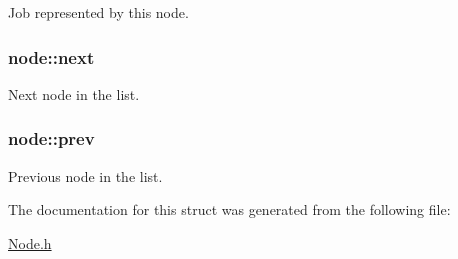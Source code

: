 Job represented by this node. 

\hypertarget{structnode_a29ed78f5e5f0fea79b113e047d18997d}{
\subsubsection[{next}]{ {\bf node::next}}}
\label{structnode_a29ed78f5e5f0fea79b113e047d18997d}


Next node in the list. 

\hypertarget{structnode_a8f67d90e34c478e9dd9a5bd51574c8c4}{
\subsubsection[{prev}]{ {\bf node::prev}}}
\label{structnode_a8f67d90e34c478e9dd9a5bd51574c8c4}


Previous node in the list. 



The documentation for this struct was generated from the following file:\begin{DoxyCompactItemize}
\item 
\hyperlink{Node_8h}{Node.h}\end{DoxyCompactItemize}
